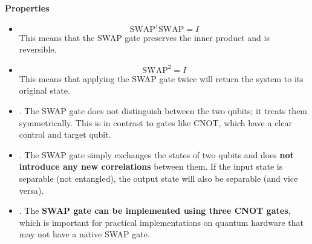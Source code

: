 \highspace
\begin{flushleft}
    \textcolor{Green3}{ \textbf{Properties}}
\end{flushleft}
\begin{itemize}
    \item {}
    \begin{equation*}
        \text{SWAP}^\dagger \text{SWAP} = I
    \end{equation*}
    This means that the SWAP gate preserves the inner product and is reversible.

    \item {}
    \begin{equation*}
        \text{SWAP}^2 = I
    \end{equation*}
    This means that applying the SWAP gate twice will return the system to its original state.

    \item {}. The SWAP gate does not distinguish between the two qubits; it treats them symmetrically. This is in contrast to gates like CNOT, which have a clear control and target qubit.
    
    \item {}. The SWAP gate simply exchanges the states of two qubits and does \textbf{not introduce any new correlations} between them. If the input state is separable (not entangled), the output state will also be separable (and vice versa).
    
    \item {}. The \textbf{SWAP gate can be implemented using three CNOT gates}, which is important for practical implementations on quantum hardware that may not have a native SWAP gate.


\end{itemize}
